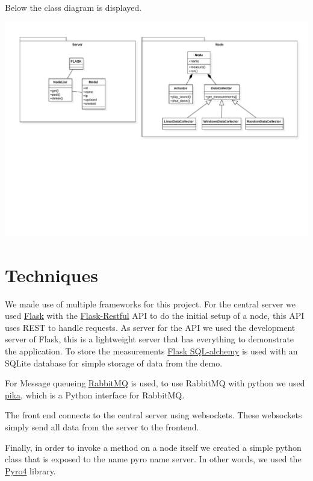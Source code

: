 \documentclass{article}
\begin{document}
	Below the class diagram is displayed.
	
	\includegraphics[width=\textwidth, trim={60 250 0 0}]{classdiagram.pdf}

\section{Techniques}
	We made use of multiple frameworks for this project. For the central server
	we used \href{http://flask.pocoo.org/}{Flask} with the 
	\href{https://flask-restful.readthedocs.io/en/0.3.5/}{Flask-Restful} API to
	do the initial setup of a node, this API uses REST to handle requests. As
	server for the API we used the development server of Flask, this is a 
	lightweight server that has everything to demonstrate the application. To 
	store the measurements 
	\href{http://flask-sqlalchemy.pocoo.org/2.1/}{Flask SQL-alchemy} is used 
	with an SQLite database for simple storage of data from the demo.
	
	For Message queueing \href{https://www.rabbitmq.com}{RabbitMQ} is used, to 
	use RabbitMQ with python we used \href{https://github.com/pika/pika}{pika}, 
	which is a Python interface for RabbitMQ. 

	The front end connects to the central server using websockets. These 
	websockets simply send all data from the server to the frontend.

	Finally, in order to invoke a method on a node itself we created a simple 
	python class that is exposed to the name pyro name server. In other words, 
	we used the \href{https://pythonhosted.org/Pyro4/}{Pyro4} library.
\end{document}
